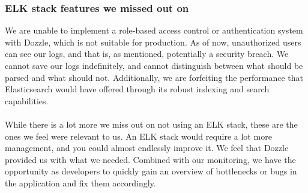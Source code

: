 \subsubsection*{ELK stack features we missed out on}
We are unable to implement a role-based access control or authentication system with Dozzle, which is not suitable for production. As of now, unauthorized users can see our logs, and that is, as mentioned, potentially a security breach. We cannot save our logs indefinitely, and cannot distinguish between what should be parsed and what should not. Additionally, we are forfeiting the performance that Elasticsearch would have offered through its robust indexing and search capabilities.
\\\\
While there is a lot more we miss out on not using an ELK stack, these are the ones we feel were relevant to us. An ELK stack would require a lot more management, and you could almost endlessly improve it. We feel that Dozzle provided us with what we needed. Combined with our monitoring, we have the opportunity as developers to quickly gain an overview of bottlenecks or bugs in the application and fix them accordingly. 